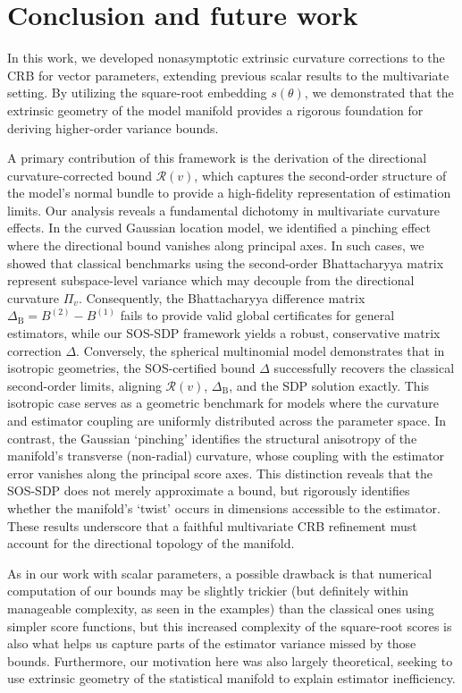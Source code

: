 \documentclass[pdflatex,sn-mathphys-num]{sn-jnl}%
\theoremstyle{thmstyleone}%
\theoremstyle{thmstyletwo}%
\theoremstyle{thmstylethree}%
\begin{document}
\section{Conclusion and future work}

In this work, we developed nonasymptotic extrinsic curvature corrections to the CRB for vector parameters, extending previous scalar results to the multivariate setting. By utilizing the square-root embedding $s(\theta)$, we demonstrated that the extrinsic geometry of the model manifold provides a rigorous foundation for deriving higher-order variance bounds. 

A primary contribution of this framework is the derivation of the directional curvature-corrected bound $\mathcal{R}(v)$, which captures the second-order structure of the model's normal bundle to provide a high-fidelity representation of estimation limits. Our analysis reveals a fundamental dichotomy in multivariate curvature effects. In the curved Gaussian location model, we identified a pinching effect where the directional bound vanishes along principal axes. In such cases, we showed that classical benchmarks using the second-order Bhattacharyya matrix represent subspace-level variance which may decouple from the directional curvature $\Pi_v$. Consequently, the Bhattacharyya difference matrix $\Delta_\mathrm{B}=B^{(2)}-B^{(1)}$ fails to provide valid global certificates for general estimators, while our SOS-SDP framework yields a robust, conservative matrix correction $\Delta$. Conversely, the spherical multinomial model demonstrates that in isotropic geometries, the SOS-certified bound $\Delta$ successfully recovers the classical second-order limits, aligning $\mathcal{R}(v)$, $\Delta_{\mathrm{B}}$, and the SDP solution exactly. This isotropic case serves as a geometric benchmark for models where the curvature and estimator coupling are uniformly distributed across the parameter space. In contrast, the Gaussian `pinching' identifies the structural anisotropy of the manifold's transverse (non-radial) curvature, whose coupling with the estimator error vanishes along the principal score axes. This distinction reveals that the SOS-SDP does not merely approximate a bound, but rigorously identifies whether the manifold’s `twist' occurs in dimensions accessible to the estimator.
These results underscore that a faithful multivariate CRB refinement must account for the directional topology of the manifold. 

As in our work with scalar parameters, a possible drawback is that numerical computation of our bounds may be slightly trickier (but definitely within manageable complexity, as seen in the examples) than the classical ones using simpler score functions, but this increased complexity of the square-root scores is also what helps us capture parts of the estimator variance missed by those bounds. Furthermore, our motivation here was also largely theoretical, seeking to use extrinsic geometry of the statistical manifold to explain estimator inefficiency.
\end{document}
